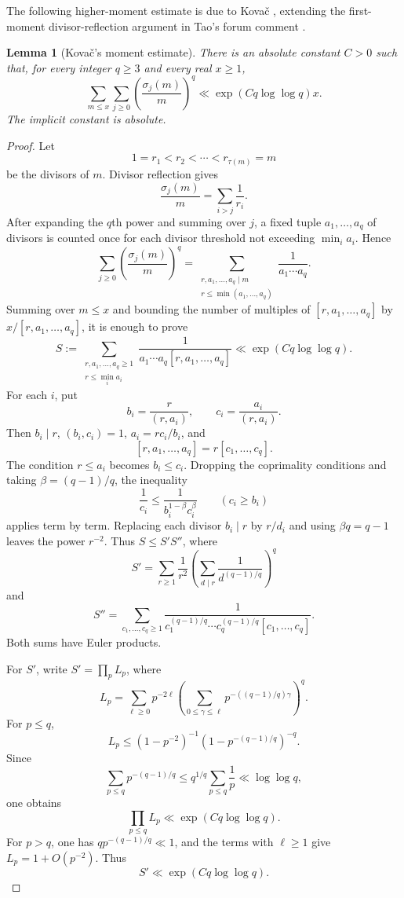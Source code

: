 \documentclass[11pt]{article}
\newtheorem{lemma}[theorem]{Lemma}
\theoremstyle{remark}
\newcommand{\1}{\mathbf 1}
\begin{document}
The following higher-moment estimate is due to Kova\v{c} \cite{Kovac},
extending the first-moment divisor-reflection argument in Tao's forum comment
\cite{TaoComment}.

\begin{lemma}[Kova\v{c}'s moment estimate]\label{lem:kovac-moment}
There is an absolute constant $C>0$ such that, for every integer $q\geq3$
and every real $x\geq1$,
\[
 \sum_{m\leq x}\sum_{j\geq0}
 \left(\frac{\sigma_j(m)}m\right)^q
 \ll \exp(Cq\log\log q)x.
\]
The implicit constant is absolute.
\end{lemma}

\begin{proof}
Let
\[
 1=r_1<r_2<\cdots<r_{\tau(m)}=m
\]
be the divisors of $m$.  Divisor reflection gives
\[
 \frac{\sigma_j(m)}m=\sum_{i>j}\frac1{r_i}.
\]
After expanding the $q$th power and summing over $j$, a fixed tuple
$a_1,\ldots,a_q$ of divisors is counted once for each divisor threshold not
exceeding $\min_i a_i$.  Hence
\[
 \sum_{j\geq0}\left(\frac{\sigma_j(m)}m\right)^q
 =
 \sum_{\substack{r,a_1,\ldots,a_q\mid m\\
                   r\leq\min(a_1,\ldots,a_q)}}
 \frac1{a_1\cdots a_q}.
\]
Summing over $m\leq x$ and bounding the number of multiples of
$[r,a_1,\ldots,a_q]$ by $x/[r,a_1,\ldots,a_q]$, it is enough to prove
\begin{equation}\label{eq:kovac-S}
 S:=\sum_{\substack{r,a_1,\ldots,a_q\geq1\\r\leq\min_i a_i}}
 \frac1{a_1\cdots a_q[r,a_1,\ldots,a_q]}
 \ll\exp(Cq\log\log q).
\end{equation}
For each $i$, put
\[
 b_i=\frac r{(r,a_i)},\qquad c_i=\frac{a_i}{(r,a_i)}.
\]
Then $b_i\mid r$, $(b_i,c_i)=1$, $a_i=rc_i/b_i$, and
\[
 [r,a_1,\ldots,a_q]=r[c_1,\ldots,c_q].
\]
The condition $r\leq a_i$ becomes $b_i\leq c_i$.  Dropping the coprimality
conditions and taking $\beta=(q-1)/q$, the inequality
\[
 \frac1{c_i}\leq\frac1{b_i^{1-\beta}c_i^\beta}
 \qquad(c_i\geq b_i)
\]
applies term by term.  Replacing each divisor $b_i\mid r$ by $r/d_i$
and using $\beta q=q-1$ leaves the power $r^{-2}$.  Thus
$S\leq S'S''$, where
\[
 S'=\sum_{r\geq1}\frac1{r^2}
 \left(\sum_{d\mid r}\frac1{d^{(q-1)/q}}\right)^q
\]
and
\[
 S''=\sum_{c_1,\ldots,c_q\geq1}
 \frac1{c_1^{(q-1)/q}\cdots c_q^{(q-1)/q}[c_1,\ldots,c_q]}.
\]
Both sums have Euler products.

For $S'$, write $S'=\prod_pL_p$, where
\[
 L_p=\sum_{\ell\geq0}p^{-2\ell}
 \left(\sum_{0\leq\gamma\leq\ell}
 p^{-((q-1)/q)\gamma}\right)^q.
\]
For $p\leq q$,
\[
 L_p\leq(1-p^{-2})^{-1}(1-p^{-(q-1)/q})^{-q}.
\]
Since
\[
 \sum_{p\leq q}p^{-(q-1)/q}
 \leq q^{1/q}\sum_{p\leq q}\frac1p
 \ll\log\log q,
\]
one obtains
\[
 \prod_{p\leq q}L_p\ll\exp(Cq\log\log q).
\]
For $p>q$, one has $qp^{-(q-1)/q}\ll1$, and the terms with $\ell\geq1$
give $L_p=1+O(p^{-2})$.  Thus
\begin{equation}\label{eq:kovac-Sprime}
 S'\ll\exp(Cq\log\log q).
\end{equation}


\end{proof}
\end{document}
